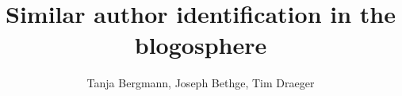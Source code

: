 \documentclass{llncs}
\title{Similar author identification in the blogosphere}
\author{Tanja Bergmann, Joseph Bethge, Tim Draeger}
\institute{Hasso Plattner Institute, Potsdam, Germany}
\begin{document}
\maketitle

\begin{abstract}

\end{abstract}















\newpage


\end{document}
